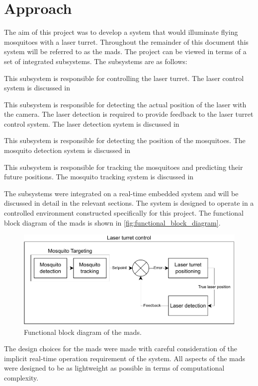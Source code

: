 
\section{Approach}
The aim of this project was to develop a system that would illuminate flying mosquitoes with a laser turret. Throughout the remainder of this document this system will be referred to as the \gls{mads}. The project can be viewed in terms of a set of integrated subsystems. The subsystems are as follows:
\begin{description}[style=nextline]
      \item[Laser Turret Control System] This subsystem is responsible for controlling the laser turret. The laser control system is discussed in
      \item[Laser Detection System] This subsystem is responsible for detecting the actual position of the laser with the camera. The laser detection is required to provide feedback to the laser turret control system. The laser detection system is discussed in
      \item[Mosquito Detection System] This subsystem is responsible for detecting the position of the mosquitoes. The mosquito detection system is discussed in
      \item[Mosquito Tracking System] This subsystem is responsible for tracking the mosquitoes and predicting their future positions. The mosquito tracking system is discussed in
\end{description}

The subsystems were integrated on a real-time embedded system and will be discussed in detail in the relevant sections. The system is designed to operate in a controlled environment constructed specifically for this project. The functional block diagram of the \gls{mads} is shown in \autoref{fig:functional_block_diagram}.

\begin{figure}[h]
      \centering
      \includegraphics[width=1\textwidth]{figures/function_block_diagram.drawio.pdf}
      \caption{Functional block diagram of the \gls{mads}.}
      \label{fig:functional_block_diagram}
\end{figure}

The design choices for the \gls{mads} were made with careful consideration of the implicit real-time operation requirement of the system. All aspects of the \gls{mads} were designed to be as lightweight as possible in terms of computational complexity.

\newpage


